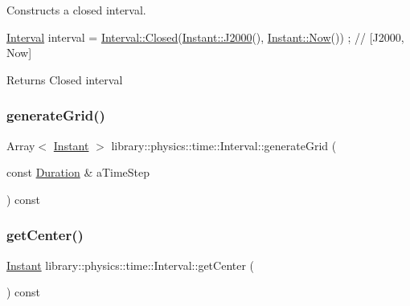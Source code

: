 Constructs a closed interval. 


\begin{DoxyCode}
\hyperlink{classlibrary_1_1physics_1_1time_1_1_interval_a49747b0d5f97a92d17f933a23b636156}{Interval} interval = \hyperlink{classlibrary_1_1physics_1_1time_1_1_interval_a89f1ca4a439fdc5224e60a441e757803}{Interval::Closed}(\hyperlink{classlibrary_1_1physics_1_1time_1_1_instant_a2a4f57aa71693b8def06788d55bc3bd3}{Instant::J2000}(), 
      \hyperlink{classlibrary_1_1physics_1_1time_1_1_instant_abdee2ddacb34859a3be2a4cf97c4af81}{Instant::Now}()) ; \textcolor{comment}{// [J2000, Now]}
\end{DoxyCode}


\begin{DoxyReturn}{Returns}
Closed interval 
\end{DoxyReturn}
\mbox{\label{classlibrary_1_1physics_1_1time_1_1_interval_aac7b4202a0d0079f59be089b6049beb3}} 
\subsubsection{\texorpdfstring{generate\+Grid()}{generateGrid()}}
{\footnotesize\ttfamily Array$<$ \hyperlink{classlibrary_1_1physics_1_1time_1_1_instant}{Instant} $>$ library\+::physics\+::time\+::\+Interval\+::generate\+Grid (\begin{DoxyParamCaption}\item[{const \hyperlink{classlibrary_1_1physics_1_1time_1_1_duration}{Duration} \&}]{a\+Time\+Step }\end{DoxyParamCaption}) const}

\mbox{\label{classlibrary_1_1physics_1_1time_1_1_interval_aadbe0ae610cc0cd188d94c41b7a03ade}} 
\subsubsection{\texorpdfstring{get\+Center()}{getCenter()}}
{\footnotesize\ttfamily \hyperlink{classlibrary_1_1physics_1_1time_1_1_instant}{Instant} library\+::physics\+::time\+::\+Interval\+::get\+Center (\begin{DoxyParamCaption}{ }\end{DoxyParamCaption}) const}


